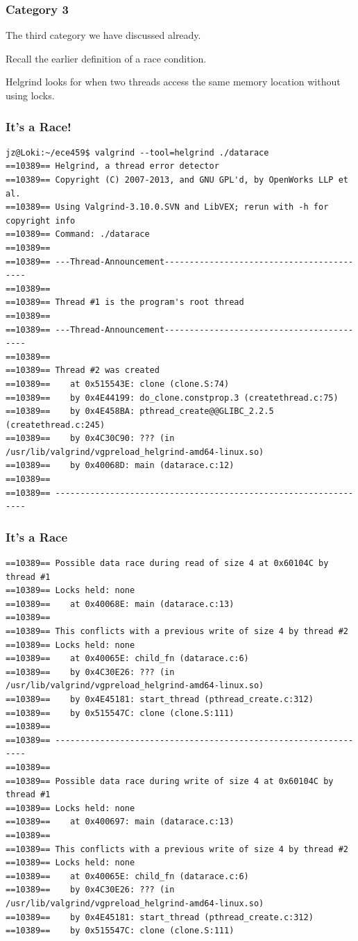 \begin{frame}
	\frametitle{Category 3}

	The third category we have discussed already.

	Recall the earlier definition of a race condition.

	Helgrind looks for when two threads access the same memory location without using locks.

\end{frame}

\begin{frame}[fragile]
	\frametitle{It's a Race!}
	{\scriptsize
		\begin{verbatim}
jz@Loki:~/ece459$ valgrind --tool=helgrind ./datarace
==10389== Helgrind, a thread error detector
==10389== Copyright (C) 2007-2013, and GNU GPL'd, by OpenWorks LLP et al.
==10389== Using Valgrind-3.10.0.SVN and LibVEX; rerun with -h for copyright info
==10389== Command: ./datarace
==10389== 
==10389== ---Thread-Announcement------------------------------------------
==10389== 
==10389== Thread #1 is the program's root thread
==10389== 
==10389== ---Thread-Announcement------------------------------------------
==10389== 
==10389== Thread #2 was created
==10389==    at 0x515543E: clone (clone.S:74)
==10389==    by 0x4E44199: do_clone.constprop.3 (createthread.c:75)
==10389==    by 0x4E458BA: pthread_create@@GLIBC_2.2.5 (createthread.c:245)
==10389==    by 0x4C30C90: ??? (in /usr/lib/valgrind/vgpreload_helgrind-amd64-linux.so)
==10389==    by 0x40068D: main (datarace.c:12)
==10389== 
==10389== ----------------------------------------------------------------
\end{verbatim}
	}

\end{frame}

\begin{frame}[fragile]
	\frametitle{It's a Race}
	{\scriptsize
		\begin{verbatim}
==10389== Possible data race during read of size 4 at 0x60104C by thread #1
==10389== Locks held: none
==10389==    at 0x40068E: main (datarace.c:13)
==10389== 
==10389== This conflicts with a previous write of size 4 by thread #2
==10389== Locks held: none
==10389==    at 0x40065E: child_fn (datarace.c:6)
==10389==    by 0x4C30E26: ??? (in /usr/lib/valgrind/vgpreload_helgrind-amd64-linux.so)
==10389==    by 0x4E45181: start_thread (pthread_create.c:312)
==10389==    by 0x515547C: clone (clone.S:111)
==10389== 
==10389== ----------------------------------------------------------------
==10389== 
==10389== Possible data race during write of size 4 at 0x60104C by thread #1
==10389== Locks held: none
==10389==    at 0x400697: main (datarace.c:13)
==10389== 
==10389== This conflicts with a previous write of size 4 by thread #2
==10389== Locks held: none
==10389==    at 0x40065E: child_fn (datarace.c:6)
==10389==    by 0x4C30E26: ??? (in /usr/lib/valgrind/vgpreload_helgrind-amd64-linux.so)
==10389==    by 0x4E45181: start_thread (pthread_create.c:312)
==10389==    by 0x515547C: clone (clone.S:111)
\end{verbatim}
	}
\end{frame}

